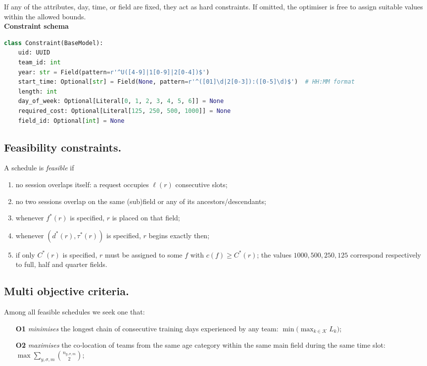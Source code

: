 \documentclass[12pt]{article}
\begin{document}
If any of the attributes, day, time, or field are fixed, they act as hard constraints. If omitted, the optimiser is free to assign suitable values within the allowed bounds.
\\

\textbf{Constraint schema}
\begin{lstlisting}[language=Python]
class Constraint(BaseModel):
    uid: UUID
    team_id: int
    year: str = Field(pattern=r'^U([4-9]|1[0-9]|2[0-4])$')
    start_time: Optional[str] = Field(None, pattern=r'^([01]\d|2[0-3]):([0-5]\d)$')  # HH:MM format
    length: int
    day_of_week: Optional[Literal[0, 1, 2, 3, 4, 5, 6]] = None
    required_cost: Optional[Literal[125, 250, 500, 1000]] = None
    field_id: Optional[int] = None
\end{lstlisting}


\vspace{.5\baselineskip}
\subsection{Feasibility constraints.}
A schedule is \emph{feasible} if
\begin{enumerate}
  \item no session overlaps itself: a request occupies $\ell(r)$
        consecutive slots;
  \item no two sessions overlap on the same (sub)field or any of its
        ancestors/descendants;
  \item whenever $f^{\!*}(r)$ is specified, $r$ is placed on that field;
  \item whenever $(d^{\!*}(r),\tau^{\!*}(r))$ is specified, $r$ begins
        exactly then;
    \item if only $C^{\!*}(r)$ is specified, $r$ must be assigned to
          some $f$ with $c(f)\!\ge\!C^{\!*}(r)$;
          the values $1000,500,250,125$ correspond respectively to
          full, half and quarter fields.

\end{enumerate}

\vspace{.5\baselineskip}
\subsection{Multi objective criteria.}
Among all feasible schedules we seek one that:
\begin{itemize}
  \item[\textbf{O1}] \emph{minimises} the longest chain of consecutive training days experienced by any team:  
        $\displaystyle\min\bigl(\max_{k\in\mathcal{K}}L_k\bigr)$;
  \item[\textbf{O2}] \emph{maximises} the co‑location of teams from the same age category within the same main field during the same time slot:  
        $\displaystyle\max\!\sum_{y,\sigma,m}\binom{n_{y,\sigma,m}}{2}$;
\end{itemize}
\end{document}
